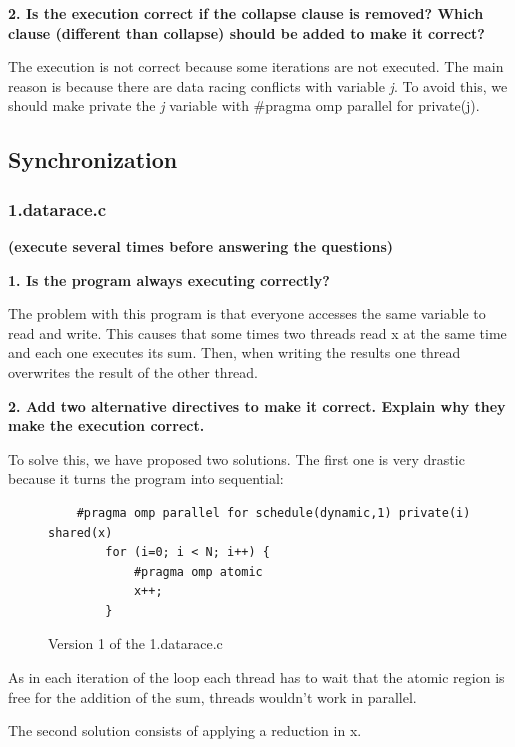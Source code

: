 \documentclass[12pt, a4paper]{article}
\begin{document}
\hfill

\textbf{2. Is the execution correct if the collapse clause is removed? Which clause (different than collapse) should be added to make it correct?}

The execution is not correct because some iterations are not executed. The main reason is because there are data racing conflicts with variable \textit{j}. To avoid this, we should make private the \textit{j} variable with \#pragma omp parallel for private(j).

\subsection{Synchronization}

\subsubsection{1.datarace.c}

\textbf{(execute several times before answering the questions)}

\hfill

\textbf{1. Is the program always executing correctly?}

The problem with this program is that everyone accesses the same variable to read and write.
This causes that some times two threads read x at the same time and each one executes its sum. Then, when writing the results one thread overwrites the result of the other thread.

\hfill

\textbf{2. Add two alternative directives to make it correct. Explain why they make the execution
correct.}

To solve this, we have proposed two solutions. The first one is very drastic because it turns the program into sequential:

\begin{figure}[H]
	\begin{lstlisting}
	#pragma omp parallel for schedule(dynamic,1) private(i) shared(x)
		for (i=0; i < N; i++) {
			#pragma omp atomic
			x++;
		}
	\end{lstlisting}
	
	\caption{Version 1 of the 1.datarace.c}
\end{figure}

As in each iteration of the loop each thread has to wait that the atomic region is free for the addition of the sum, threads wouldn't work in parallel.

The second solution consists of applying a reduction in x.
\end{document}

